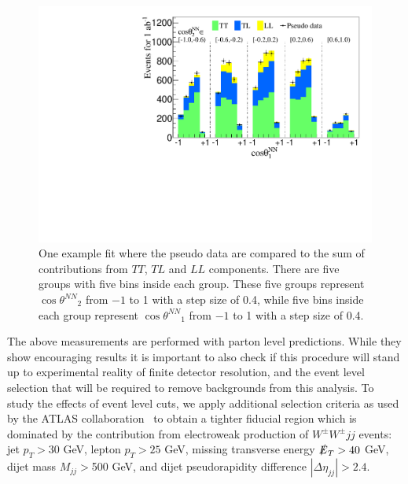 \documentclass[aps,prl,twocolumn,showpacs,superscriptaddress,groupeaddress,floatfix]{revtex4}
\def\ssWW{\ensuremath{ W^{\pm}W^{\pm}jj }\xspace}
\def\tsNN{\ensuremath{ \theta^{NN} }\xspace}
\def\ctsNN{\ensuremath{ \cos\tsNN }\xspace}
\begin{document}
\begin{figure}[h]

\includegraphics[width=.45\textwidth]{fig_03.pdf}


\caption{\label{fig:fit_example} One example fit where the pseudo data are compared to the sum of 
contributions from $TT$, $TL$ and $LL$ components. There are five groups with five bins inside each group. 
These five groups represent $\ctsNN_2$ from $-1$ to 1 with a step size of 0.4, while five bins inside each group represent $\ctsNN_1$ from $-1$ to 1 with a step size of 0.4. }
\end{figure}

The above measurements are performed with parton level predictions. While they show encouraging results  it is important 
to also check if this procedure will stand up to experimental reality of finite detector resolution, and the event level selection that
will be required to remove backgrounds from this analysis. To study the effects of event level cuts, we apply additional selection criteria as used by the ATLAS collaboration~\cite{ATLAS_ssWW} to obtain a
tighter fiducial region which is dominated by the contribution from electroweak production of \ssWW events: jet $p_T > 30$ GeV, lepton $p_T > 25$ GeV, missing transverse energy $\slashed{E}_T > 40$ GeV, 
dijet mass $M_{jj} > $500 GeV, and dijet pseudorapidity difference $|\Delta \eta_{jj}| > 2.4 $. 
\end{document}

